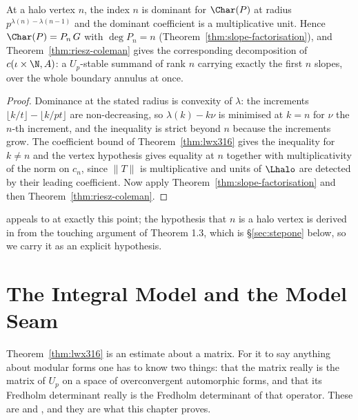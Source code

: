\begin{theorem}
  \label{thm:halo-riesz}
  \leanok
  At a halo vertex $n$, the index $n$ is dominant for $\Char(P)$ at radius
  $p^{\lambda(n)-\lambda(n-1)}$ and the dominant coefficient is a multiplicative unit.  Hence
  $\Char(P) = P_n\,G$ with $\deg P_n = n$ (Theorem~\ref{thm:slope-factorisation}), and
  Theorem~\ref{thm:riesz-coleman} gives the corresponding decomposition of
  $c(\iota\times\N, A)$: a $U_p$-stable summand of rank $n$ carrying exactly the first $n$
  slopes, over the whole boundary annulus at once.
\end{theorem}

\begin{proof}
  \leanok
  Dominance at the stated radius is convexity of $\lambda$: the increments
  $\lfloor k/t\rfloor - \lfloor k/pt\rfloor$ are non-decreasing, so $\lambda(k) - k\nu$ is
  minimised at $k = n$ for $\nu$ the $n$-th increment, and the inequality is strict beyond $n$
  because the increments grow.  The coefficient bound of Theorem~\ref{thm:lwx316} gives the
  inequality for $k \neq n$ and the vertex hypothesis gives equality at $n$ together with
  multiplicativity of the norm on $c_n$, since $\lVert T\rVert$ is multiplicative and units of
  $\Lhalo$ are detected by their leading coefficient.  Now apply
  Theorem~\ref{thm:slope-factorisation} and then Theorem~\ref{thm:riesz-coleman}.
\end{proof}

\cite[Remark 3.25]{LWX} appeals to \cite[Proposition 3.2.2]{Kedlaya} at exactly this point; the
hypothesis that $n$ is a halo vertex is derived in \cite{LWX} from the touching argument of
Theorem 1.3, which is \S\ref{sec:stepone} below, so we carry it as an explicit hypothesis.


\chapter{The Integral Model and the Model Seam}
\label{chap:lwx-model}

Theorem~\ref{thm:lwx316} is an estimate about a matrix.  For it to say anything about modular
forms one has to know two things: that the matrix really is the matrix of $U_p$ on a space of
overconvergent automorphic forms, and that its Fredholm determinant really is the Fredholm
determinant of that operator.  These are \cite[Proposition 3.1]{LWX} and
\cite[Proposition 2.17]{LWX}, and they are what this chapter proves.

